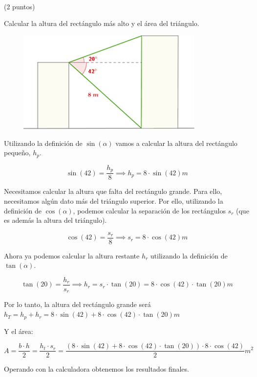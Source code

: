 \documentclass[palatino,nosec,nobuildate]{Docencia}
\begin{document}
\begin{problem} (2 puntos)

Calcular la altura del rectángulo más alto y el área del triángulo.

\solution

\begin{figure}[h]
\centering
\includegraphics[scale=0.5]{prob.png}
\end{figure}

Utilizando la definición de $\sin(α)$ vamos a calcular la altura del rectángulo pequeño, $h_p$.

\[\sin(42) = \frac{h_p}{8} \implies h_p = 8·\sin(42)m\]

Necesitamos calcular la altura que falta del rectángulo grande. Para ello, necesitamos algún dato más del triángulo superior. Por ello, utilizando la definición de $\cos(α)$, podemos calcular la separación de los rectángulos $s_r$ (que es además la altura del triángulo).

\[
	\cos(42) = \frac{s_r}{8} \implies s_r = 8·\cos(42)m
\]

Ahora ya podemos calcular la altura restante $h_r$ utilizando la definición de $\tan(α)$.

\[
	\tan(20) = \frac{h_r}{s_r} \implies h_r = s_r·\tan(20) = 8·\cos(42)·\tan(20)m
\]

Por lo tanto, la altura del rectángulo grande será $h_T = h_p+h_r = 8·\sin(42)+8·\cos(42)·\tan(20)m$

Y el área:

\[
	A = \frac{b·h}{2} = \frac{h_t·s_r}{2} = \frac{\left(8·\sin(42)+8·\cos(42)·\tan(20)\right)·8·\cos(42)}{2}m^2
\]

Operando con la calculadora obtenemos los resultados finales.

\end{problem}
\end{document}
